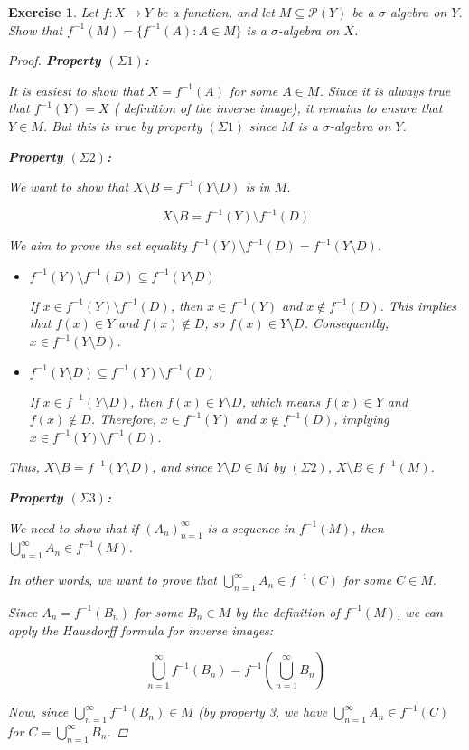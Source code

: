 \documentclass{article}
\newtheorem{exercise}{Exercise}
\begin{document}
    \begin{exercise}
        Let $f: X \to Y$ be a function, and let $M \subseteq \mathcal{P}(Y)$ be a $\sigma$-algebra on $Y$. Show that $f^{-1}(M) = \{f^{-1}(A): A \in M\}$ is a $\sigma$-algebra on $X$.
    \begin{proof}
        \textbf{Property $(\Sigma 1)$:}

It is easiest to show that $X = f^{-1}(A)$ for some $A \in M$. Since it is always true that $f^{-1}(Y) = X$ ( definition of the inverse image), it remains to ensure that $Y \in M$. But this is true by property $(\Sigma 1)$ since $M$ is a $\sigma$-algebra on $Y$.

\textbf{Property $(\Sigma 2)$:}

We want to show that $X \setminus B = f^{-1}(Y \setminus D)$ is in $M$. 

\[X \setminus B = f^{-1}(Y) \setminus f^{-1}(D)\]

We aim to prove the set equality $f^{-1}(Y) \setminus f^{-1}(D) = f^{-1}(Y \setminus D)$.

\begin{itemize}
    \item $f^{-1}(Y) \setminus f^{-1}(D) \subseteq f^{-1}(Y \setminus D)$

    If $x \in f^{-1}(Y) \setminus f^{-1}(D)$, then $x \in f^{-1}(Y)$ and $x \notin f^{-1}(D)$. This implies that $f(x) \in Y$ and $f(x) \notin D$, so $f(x) \in Y \setminus D$. Consequently, $x \in f^{-1}(Y \setminus D)$.

    \item $f^{-1}(Y \setminus D) \subseteq f^{-1}(Y) \setminus f^{-1}(D)$

    If $x \in f^{-1}(Y \setminus D)$, then $f(x) \in Y \setminus D$, which means $f(x) \in Y$ and $f(x) \notin D$. Therefore, $x \in f^{-1}(Y)$ and $x \notin f^{-1}(D)$, implying $x \in f^{-1}(Y) \setminus f^{-1}(D)$.
\end{itemize}

Thus, $X \setminus B = f^{-1}(Y \setminus D)$, and since $Y \setminus D \in M$ by $(\Sigma 2)$, $X \setminus B \in f^{-1}(M)$.


\textbf{Property $(\Sigma 3)$:}

We need to show that if $(A_n)_{n=1}^{\infty}$ is a sequence in $f^{-1}(M)$, then $\bigcup_{n=1}^{\infty} A_n \in f^{-1}(M)$.

In other words, we want to prove that $\bigcup_{n=1}^{\infty} A_n \in f^{-1}(C)$ for some $C \in M$.

Since $A_n = f^{-1}(B_n)$ for some $B_n \in M$ by the definition of $f^{-1}(M)$, we can apply the Hausdorff formula for inverse images:

\[\bigcup_{n=1}^{\infty} f^{-1}(B_n) = f^{-1}\left(\bigcup_{n=1}^{\infty} B_n\right)\]

Now, since $\bigcup_{n=1}^{\infty} f^{-1}(B_n) \in M$ (by property 3, we have $\bigcup_{n=1}^{\infty} A_n \in f^{-1}(C)$ for $C = \bigcup_{n=1}^{\infty} B_n$.
\end{proof}
\end{exercise}
\end{document}
